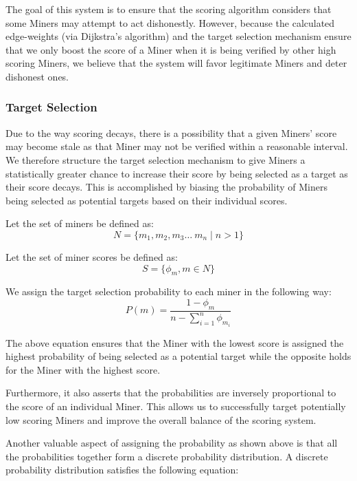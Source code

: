 \documentclass[10pt, nonatbib, nocopyrightspace, reprint]{sigplanconf}
\begin{document}
The goal of this system is to ensure that the scoring algorithm considers that some Miners may attempt to act dishonestly. However, because the calculated edge-weights (via Dijkstra's algorithm) and the target selection mechanism ensure that we only boost the score of a Miner when it is being verified by other high scoring Miners, we believe that the system will favor legitimate Miners and deter dishonest ones.

\subsubsection{Target Selection}

Due to the way scoring decays, there is a possibility that a given Miners' score may become stale as that Miner may not be verified within a reasonable interval. We therefore structure the target selection mechanism to give Miners a statistically greater chance to increase their score by being selected as a target as their score decays. This is accomplished by biasing the probability of Miners being selected as potential targets based on their individual scores.

Let the set of miners be defined as:
\begin{equation*} \label{eq:set-of-miners}
        N = \{m_1, m_2, m_3 \dots\ m_n \mid n > 1\}
\end{equation*}

Let the set of miner scores be defined as:
\begin{equation*} \label{eq:set-of-scores}
        S = \{\phi_m, m \in N\}
\end{equation*}

We assign the target selection probability to each miner in the following way:
\begin{equation} \label{eq:target-selection-probability}
        P(m) = \frac{1-\phi_m}{n - \displaystyle\sum_{i=1}^{n} {\phi_{m_i}}}
\end{equation}

The above equation ensures that the Miner with the lowest score is assigned the highest probability of being selected as a potential target while the opposite holds for the Miner with the highest score.

Furthermore, it also asserts that the probabilities are inversely proportional to the score of an individual Miner. This allows us to successfully target potentially low scoring Miners and improve the overall balance of the scoring system.

Another valuable aspect of assigning the probability as shown above is that all the probabilities together form a discrete probability distribution. A discrete probability distribution satisfies the following equation:
\end{document}
